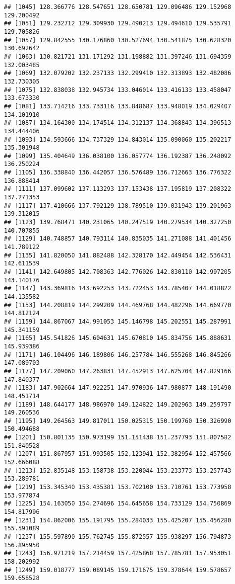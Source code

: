 \documentclass[]{article}
\begin{document}
\begin{verbatim}
## [1045] 128.366776 128.547651 128.650781 129.096486 129.152968 129.200492
## [1051] 129.232712 129.309930 129.490213 129.494610 129.535791 129.705826
## [1057] 129.842555 130.176860 130.527694 130.541875 130.628320 130.692642
## [1063] 130.821721 131.171292 131.198882 131.397246 131.694359 132.003485
## [1069] 132.079202 132.237133 132.299410 132.313893 132.482086 132.730305
## [1075] 132.838038 132.945734 133.046014 133.416133 133.458047 133.673330
## [1081] 133.714216 133.733116 133.848687 133.948019 134.029407 134.101910
## [1087] 134.164300 134.174514 134.312137 134.368843 134.396513 134.444406
## [1093] 134.593666 134.737329 134.843014 135.090060 135.202217 135.301948
## [1099] 135.404649 136.038100 136.057774 136.192387 136.248092 136.250224
## [1105] 136.338840 136.442057 136.576489 136.712663 136.776322 136.888414
## [1111] 137.099602 137.113293 137.153438 137.195819 137.208322 137.271353
## [1117] 137.410666 137.792129 138.789510 139.031943 139.201963 139.312015
## [1123] 139.768471 140.231065 140.247519 140.279534 140.327250 140.707855
## [1129] 140.748857 140.793114 140.835035 141.271088 141.401456 141.789122
## [1135] 141.820050 141.882488 142.328170 142.449454 142.536431 142.611539
## [1141] 142.649805 142.708363 142.776026 142.830110 142.997205 143.140176
## [1147] 143.369816 143.692253 143.722453 143.785407 144.018822 144.135582
## [1153] 144.208819 144.299209 144.469768 144.482296 144.669770 144.812124
## [1159] 144.867067 144.991053 145.146798 145.202551 145.287991 145.341159
## [1165] 145.541826 145.604631 145.670810 145.834756 145.888631 145.939386
## [1171] 146.104496 146.189806 146.257784 146.555268 146.845266 147.089703
## [1177] 147.209060 147.263831 147.452913 147.625704 147.829166 147.840377
## [1183] 147.902664 147.922251 147.970936 147.980877 148.191490 148.451714
## [1189] 148.644177 148.986970 149.124822 149.202963 149.259797 149.260536
## [1195] 149.264563 149.817011 150.025315 150.199760 150.326990 150.494688
## [1201] 150.801135 150.973199 151.151438 151.237793 151.807582 151.840528
## [1207] 151.867957 151.993505 152.123941 152.382954 152.457566 152.666088
## [1213] 152.835148 153.158738 153.220044 153.233773 153.257743 153.289781
## [1219] 153.345340 153.435381 153.702100 153.710761 153.773958 153.977874
## [1225] 154.163050 154.274696 154.645658 154.733129 154.750869 154.817996
## [1231] 154.862006 155.191795 155.284033 155.425207 155.456280 155.591089
## [1237] 155.597890 155.762745 155.872557 155.938297 156.794873 156.895950
## [1243] 156.971219 157.214459 157.425868 157.785781 157.953051 158.202992
## [1249] 159.018777 159.089145 159.171675 159.378644 159.578657 159.658528

\end{verbatim}
\end{document}
